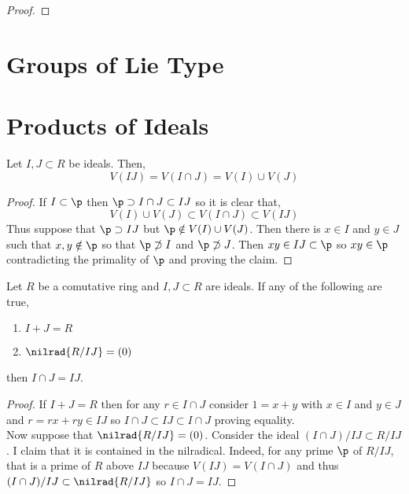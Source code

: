 \documentclass[12pt]{article}
\begin{document}
\begin{proof}

\end{proof}


\section{Groups of Lie Type}

\section{Products of Ideals}

\begin{lemma}
Let $I, J \subset R$ be ideals. Then,
\[ V(IJ) = V(I \cap J) = V(I) \cup V(J) \]
\end{lemma}

\begin{proof}
If $I \subset \p$ then $\p \supset I \cap J \subset IJ$ so it is clear that,
\[ V(I) \cup V(J) \subset V(I \cap J) \subset V(IJ) \]
Thus suppose that $\p \supset IJ$ but $\p \notin V(I) \cup V(J)$. Then there is $x \in I$ and $y \in J$ such that $x, y \notin \p$ so that $\p \not\supset I$ and $\p \not \supset J$. Then $x y \in IJ \subset \p$ so $x y \in \p$ contradicting the primality of $\p$ and proving the claim.
\end{proof}

\begin{prop}
Let $R$ be a comutative ring and $I, J \subset R$ are ideals.
If any of the following are true,
\begin{enumerate}
\item $I + J = R$
\item $\nilrad{R / IJ} = (0)$
\end{enumerate}
then $I \cap J = IJ$.
\end{prop}

\begin{proof}
If $I + J = R$ then for any $r \in I \cap J$ consider $1 = x + y$ with $x \in I$ and $y \in J$ and $r = r x + ry \in IJ$ so $I \cap J \subset IJ \subset I \cap J$ proving equality. 
\bigskip\\
Now suppose that $\nilrad{R / IJ} = (0)$. Consider the ideal $(I \cap J)/IJ \subset R / IJ$. I claim that it is contained in the nilradical. Indeed, for any prime $\p$ of $R / IJ$, that is a prime of $R$ above $IJ$ because $V(IJ) = V(I \cap J)$ and thus $(I \cap J)/IJ \subset \nilrad{R / IJ}$ so $I \cap J = IJ$.
\end{proof}
\end{document}
